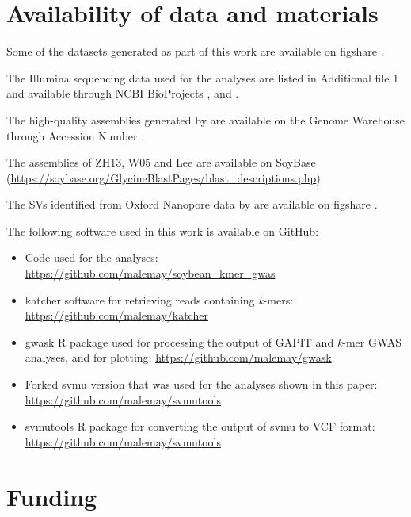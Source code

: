 \section*{Availability of data and materials}
\label{sv-gwas-availability}

Some of the datasets generated as part of this work are available on figshare
\citep{kmer-gwas-figshare}.

The Illumina sequencing data used for the analyses are listed in Additional file 1
and available through NCBI BioProjects \citeauthor{PRJNA257011}, \citeauthor{PRJNA289660}
and \citeauthor{PRJNA639876}.

The high-quality assemblies generated by \cite{liu2020-pangenome} are available
on the Genome Warehouse through Accession Number \citeauthor{PRJCA002030}.

The assemblies of ZH13, W05 and Lee are available on SoyBase
(\url{https://soybase.org/GlycineBlastPages/blast_descriptions.php}).

The SVs identified from Oxford Nanopore data by \cite{lemay2022} are available
on figshare \citep{soybean-sv-figshare}.

The following software used in this work is available on GitHub:

\begin{itemize}
	\item Code used for the analyses:
		\url{https://github.com/malemay/soybean_kmer_gwas}
	\item katcher software for retrieving reads containing \textit{k}-mers:
		\url{https://github.com/malemay/katcher}
	\item gwask R package used for processing the output of GAPIT and
		\textit{k}-mer GWAS analyses, and for plotting:
		\url{https://github.com/malemay/gwask}
	\item Forked svmu version that was used for the analyses shown in this
		paper: \url{https://github.com/malemay/svmutools}
	\item svmutools R package for converting the output of svmu to VCF
		format: \url{https://github.com/malemay/svmutools}
\end{itemize}

\section*{Funding}
\label{sv-gwas-funding}

